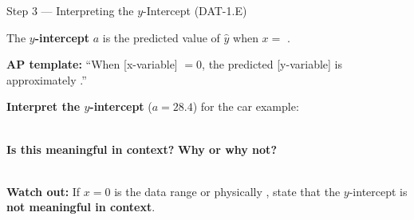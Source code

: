 \documentclass[10pt]{article}
\begin{document}
\vspace{0.1in}

\begin{notesbox}{Step 3 --- Interpreting the $y$-Intercept (DAT-1.E)}
\small

\noindent The \textbf{$y$-intercept} $a$ is the predicted value of $\hat{y}$ when $x = $ \blank{1.5cm}.

\vspace{6pt}
\textbf{AP template:} ``When [x-variable] $= 0$, the predicted [y-variable] is approximately
\blank{3cm}.''

\vspace{8pt}
\textbf{Interpret the $y$-intercept} ($a = 28.4$) for the car example:
\vspace{4pt}\\
\writeline\\[2pt]\writeline

\vspace{6pt}
\textbf{Is this meaningful in context?} \blank{3cm} \quad \textbf{Why or why not?}\\[6pt]
\writeline\\[2pt]\writeline

\vspace{4pt}
\begin{tcolorbox}[colback=redbg, colframe=redacc, boxrule=0.8pt, arc=2mm,
    left=3mm, right=3mm, top=2mm, bottom=2mm]
\small\textbf{Watch out:} If $x = 0$ is \blank{4cm} the data range or physically
\blank{4cm}, state that the $y$-intercept is \textbf{not meaningful in context}.
\end{tcolorbox}

\end{notesbox}

\vspace{0.1in}
\end{document}
